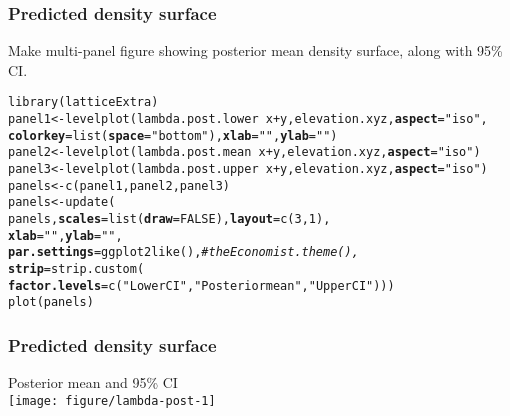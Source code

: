 \documentclass[color=usenames,dvipsnames]{beamer}\usepackage[]{graphicx}\usepackage[]{color}
\makeatletter
\newcommand{\hlnum}[1]{\textcolor[rgb]{0.69,0.494,0}{#1}}%
\newcommand{\hlstr}[1]{\textcolor[rgb]{0.749,0.012,0.012}{#1}}%
\newcommand{\hlcom}[1]{\textcolor[rgb]{0.514,0.506,0.514}{\textit{#1}}}%
\newcommand{\hlopt}[1]{\textcolor[rgb]{0,0,0}{#1}}%
\newcommand{\hlstd}[1]{\textcolor[rgb]{0,0,0}{#1}}%
\newcommand{\hlkwb}[1]{\textcolor[rgb]{0,0.341,0.682}{#1}}%
\newcommand{\hlkwc}[1]{\textcolor[rgb]{0,0,0}{\textbf{#1}}}%
\newcommand{\hlkwd}[1]{\textcolor[rgb]{0.004,0.004,0.506}{#1}}%
\newenvironment{kframe}{%
 \def\at@end@of@kframe{}%
 \ifinner\ifhmode%
  \def\at@end@of@kframe{\end{minipage}}%
  \begin{minipage}{\columnwidth}%
 \fi\fi%
 \def\FrameCommand##1{\hskip\@totalleftmargin \hskip-\fboxsep
 \colorbox{shadecolor}{##1}\hskip-\fboxsep
     \hskip-\linewidth \hskip-\@totalleftmargin \hskip\columnwidth}%
 \MakeFramed {\advance\hsize-\width
   \@totalleftmargin\z@ \linewidth\hsize
   \@setminipage}}%
 {\par\unskip\endMakeFramed%
 \at@end@of@kframe}
\newenvironment{knitrout}{}{} %
\makeatother
\begin{document}
\begin{frame}[fragile]
  \frametitle{Predicted density surface}
  Make multi-panel figure showing posterior mean density surface,
  along with 95\% CI.
\begin{knitrout}\scriptsize
{}\color{fgcolor}\begin{kframe}
\begin{alltt}
\hlkwd{library}\hlstd{(latticeExtra)}
\hlstd{panel1} \hlkwb{<-} \hlkwd{levelplot}\hlstd{(lambda.post.lower} \hlopt{~} \hlstd{x}\hlopt{+}\hlstd{y, elevation.xyz,} \hlkwc{aspect}\hlstd{=}\hlstr{"iso"}\hlstd{,}
                    \hlkwc{colorkey}\hlstd{=}\hlkwd{list}\hlstd{(}\hlkwc{space}\hlstd{=}\hlstr{"bottom"}\hlstd{),} \hlkwc{xlab}\hlstd{=}\hlstr{""}\hlstd{,} \hlkwc{ylab}\hlstd{=}\hlstr{""}\hlstd{)}
\hlstd{panel2} \hlkwb{<-} \hlkwd{levelplot}\hlstd{(lambda.post.mean} \hlopt{~}\hlstd{x}\hlopt{+}\hlstd{y, elevation.xyz,} \hlkwc{aspect}\hlstd{=}\hlstr{"iso"}\hlstd{)}
\hlstd{panel3} \hlkwb{<-} \hlkwd{levelplot}\hlstd{(lambda.post.upper} \hlopt{~}\hlstd{x}\hlopt{+}\hlstd{y, elevation.xyz,} \hlkwc{aspect}\hlstd{=}\hlstr{"iso"}\hlstd{)}
\hlstd{panels} \hlkwb{<-} \hlkwd{c}\hlstd{(panel1, panel2, panel3)}
\hlstd{panels} \hlkwb{<-} \hlkwd{update}\hlstd{(}
    \hlstd{panels,} \hlkwc{scales}\hlstd{=}\hlkwd{list}\hlstd{(}\hlkwc{draw}\hlstd{=}\hlnum{FALSE}\hlstd{),} \hlkwc{layout}\hlstd{=}\hlkwd{c}\hlstd{(}\hlnum{3}\hlstd{,}\hlnum{1}\hlstd{),}
    \hlkwc{xlab}\hlstd{=}\hlstr{""}\hlstd{,} \hlkwc{ylab}\hlstd{=}\hlstr{""}\hlstd{,}
    \hlkwc{par.settings}\hlstd{=}\hlkwd{ggplot2like}\hlstd{(),} \hlcom{#theEconomist.theme(), }
    \hlkwc{strip}\hlstd{=}\hlkwd{strip.custom}\hlstd{(}
        \hlkwc{factor.levels}\hlstd{=}\hlkwd{c}\hlstd{(}\hlstr{"Lower CI"}\hlstd{,}\hlstr{"Posterior mean"}\hlstd{,}\hlstr{"Upper CI"}\hlstd{)))}
\hlkwd{plot}\hlstd{(panels)}
\end{alltt}
\end{kframe}
\end{knitrout}
\end{frame}




\begin{frame}
  \frametitle{Predicted density surface}
  Posterior mean and 95\% CI \\
  \texttt{[image: figure/lambda-post-1]}  
\end{frame}
\end{document}
